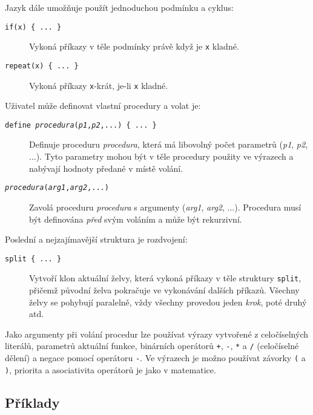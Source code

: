 Jazyk dále umožňuje použít jednoduchou podmínku a cyklus:

\begin{description}
\item[\texttt{if(x) \{ ... \}}] Vykoná příkazy v těle podmínky právě když je
\texttt{x} kladné.
\item[\texttt{repeat(x) \{ ... \}}] Vykoná příkazy \texttt{x}-krát, je-li
\texttt{x} kladné.
\end{description}

Uživatel může definovat vlastní procedury a volat je:

\begin{description}

\item[\texttt{define 
  \textit{procedura}(\textit{p1},\textit{p2},...)
  \{ ... \}
}]
  Definuje proceduru \textit{procedura}, která má libovolný počet parametrů
  (\textit{p1}, \textit{p2}, ...). Tyto parametry mohou být v těle procedury
  použity ve výrazech a nabývají hodnoty předané v místě volání.

\item[\texttt{\textit{procedura}(\textit{arg1},\textit{arg2},...)}]
  Zavolá proceduru \textit{procedura} s argumenty (\textit{arg1}, \textit{arg2},
  ...). Procedura musí být definována \textit{před} svým voláním a může být
  rekurzivní.

\end{description}

Poslední a nejzajímavější struktura je rozdvojení:

\begin{description}
\item[\texttt{split \{ ... \}}] Vytvoří klon aktuální želvy, která vykoná
příkazy v těle struktury \texttt{split}, přičemž původní želva pokračuje ve vykonávání
dalších příkazů. Všechny želvy se pohybují paralelně, vždy všechny provedou
jeden \emph{krok}, poté druhý atd.
\end{description}

Jako argumenty při volání procedur lze používat výrazy vytvořené z celočíselných
literálů, parametrů aktuální funkce, binárních operátorů \texttt{+}, \texttt{-},
\texttt{*} a \texttt{/} (celočíselné dělení) a negace pomocí operátoru
\texttt{-}. Ve výrazech je možno používat závorky \texttt{(} a \texttt{)},
priorita a asociativita operátorů je jako v matematice.

\subsection{Příklady}

